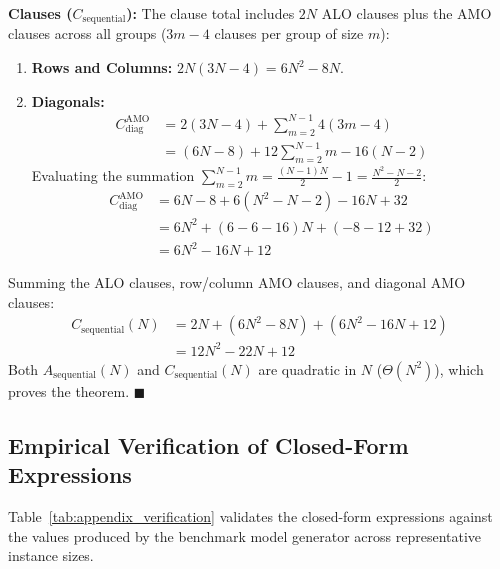 \textbf{Clauses ($C_{\text{sequential}}$):}
The clause total includes $2N$ ALO clauses plus the AMO clauses across all groups ($3m-4$ clauses per group of size $m$):
\begin{enumerate}
    \item \textbf{Rows and Columns:} $2N(3N-4) = 6N^2 - 8N$.
    \item \textbf{Diagonals:}
    \begin{align}
    C_{\text{diag}}^{\text{AMO}} &= 2(3N-4) + \sum_{m=2}^{N-1} 4(3m-4) \nonumber \\
    &= (6N-8) + 12 \sum_{m=2}^{N-1} m - 16(N-2)
    \end{align}
    Evaluating the summation $\sum_{m=2}^{N-1} m = \frac{(N-1)N}{2} - 1 = \frac{N^2 - N - 2}{2}$:
    \begin{align}
    C_{\text{diag}}^{\text{AMO}} &= 6N - 8 + 6(N^2 - N - 2) - 16N + 32 \nonumber \\
    &= 6N^2 + (6 - 6 - 16)N + (-8 - 12 + 32) \nonumber \\
    &= 6N^2 - 16N + 12
    \end{align}
\end{enumerate}
Summing the ALO clauses, row/column AMO clauses, and diagonal AMO clauses:
\begin{align}
C_{\text{sequential}}(N) &= 2N + (6N^2 - 8N) + (6N^2 - 16N + 12) \nonumber \\
&= 12N^2 - 22N + 12
\end{align}
Both $A_{\text{sequential}}(N)$ and $C_{\text{sequential}}(N)$ are quadratic in $N$ ($\Theta(N^2)$), which proves the theorem. \hfill $\blacksquare$

\subsection{Empirical Verification of Closed-Form Expressions}
\label{subsec:verification_table}

Table~\ref{tab:appendix_verification} validates the closed-form expressions against the values produced by the benchmark model generator across representative instance sizes.

